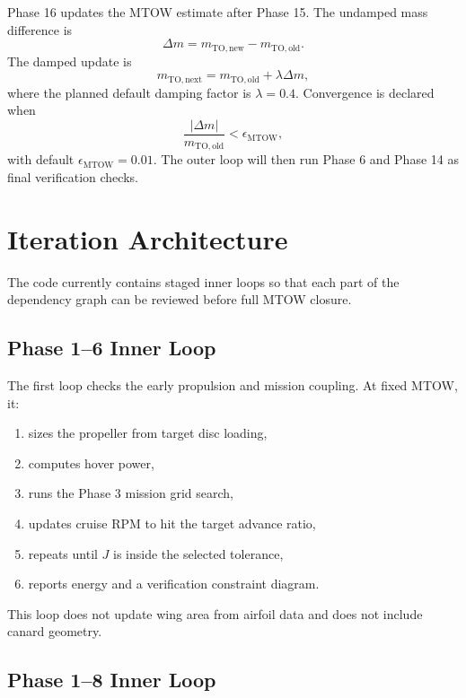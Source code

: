 Phase 16 updates the MTOW estimate after Phase 15. The undamped mass difference is
\begin{equation}
    \Delta m =
    m_{\mathrm{TO,new}}-m_{\mathrm{TO,old}}.
    \label{eq:ppa_delta_mass}
\end{equation}
The damped update is
\begin{equation}
    m_{\mathrm{TO,next}} =
    m_{\mathrm{TO,old}}+\lambda\Delta m,
    \label{eq:ppa_damped_mtow}
\end{equation}
where the planned default damping factor is \(\lambda=0.4\). Convergence is declared when
\begin{equation}
    \frac{|\Delta m|}{m_{\mathrm{TO,old}}}<\epsilon_{\mathrm{MTOW}},
    \label{eq:ppa_mtow_convergence}
\end{equation}
with default \(\epsilon_{\mathrm{MTOW}}=0.01\). The outer loop will then run Phase 6 and Phase 14 as final verification checks.

\section{Iteration Architecture}
\label{sec:ppa_iteration_architecture}

The code currently contains staged inner loops so that each part of the dependency graph can be reviewed before full MTOW closure.

\subsection{Phase 1--6 Inner Loop}

The first loop checks the early propulsion and mission coupling. At fixed MTOW, it:
\begin{enumerate}[leftmargin=*]
    \item sizes the propeller from target disc loading,
    \item computes hover power,
    \item runs the Phase 3 mission grid search,
    \item updates cruise RPM to hit the target advance ratio,
    \item repeats until \(J\) is inside the selected tolerance,
    \item reports energy and a verification constraint diagram.
\end{enumerate}
This loop does not update wing area from airfoil data and does not include canard geometry.

\subsection{Phase 1--8 Inner Loop}

